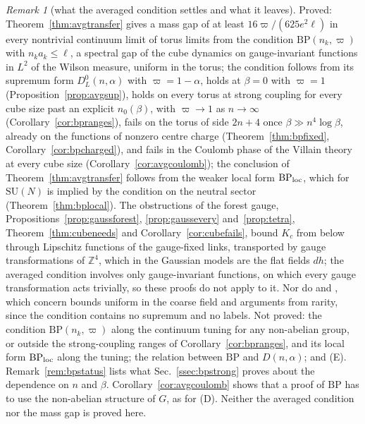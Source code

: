 \documentclass[aps,prd,twocolumn,superscriptaddress,nofootinbib,longbibliography,floatfix,amsmath,amssymb,10pt]{revtex4-2}
\theoremstyle{definition}
\theoremstyle{remark}
\newtheorem{remark}[theorem]{Remark}
\newcommand{\Z}{\mathbb{Z}}
\newcommand{\SU}{\mathrm{SU}}
\begin{document}
\begin{remark}[what the averaged condition settles and what it
leaves]\label{rem:avgstatus}
Proved: Theorem~\ref{thm:avgtransfer} gives a mass gap of at least
$16\varpi/(625e^2\ell)$ in every nontrivial continuum limit of torus limits
from the condition $\mathrm{BP}(n_k,\varpi)$ with $n_ka_k\le\ell$, a
spectral gap of the cube dynamics on gauge-invariant functions in
$L^2$ of the Wilson measure, uniform in the torus; the condition follows
from its supremum form $D^0_L(n,\alpha)$ with $\varpi=1-\alpha$, holds at
$\beta=0$ with $\varpi=1$ (Proposition~\ref{prop:avgsup}), holds on every
torus at strong coupling for every cube size past an explicit $n_0(\beta)$,
with $\varpi\to1$ as $n\to\infty$ (Corollary~\ref{cor:bpranges}), fails on
the torus of side $2n+4$ once $\beta\gg n^4\log\beta$, already on the
functions of nonzero centre charge (Theorem~\ref{thm:bpfixed},
Corollary~\ref{cor:bpcharged}), and fails in the Coulomb phase of the Villain
theory at every cube size (Corollary~\ref{cor:avgcoulomb}); the conclusion of
Theorem~\ref{thm:avgtransfer} follows from the weaker local form
$\mathrm{BP}_{\rm loc}$, which for $\SU(N)$ is implied by the condition on
the neutral sector (Theorem~\ref{thm:bplocal}). The obstructions of the forest gauge,
Propositions~\ref{prop:gaussforest}, \ref{prop:gaussevery}
and~\ref{prop:tetra}, Theorem~\ref{thm:cubeneeds} and
Corollary~\ref{cor:cubefails}, bound $K_c$ from below through Lipschitz
functions of the gauge-fixed links, transported by gauge transformations
of $\Z^4$, which in the Gaussian models are the flat fields $dh$; the
averaged condition
involves only gauge-invariant functions, on which every gauge
transformation acts trivially, so these proofs do not apply to it. Nor do
\cite[Theorem~505]{BBLR26} and \cite[Proposition~455]{BBLR26},
which concern bounds uniform in the coarse field and arguments from rarity,
since the condition contains no supremum and no labels. Not proved: the
condition $\mathrm{BP}(n_k,\varpi)$ along the continuum tuning for any
non-abelian group, or outside the strong-coupling ranges of
Corollary~\ref{cor:bpranges}, and its local form $\mathrm{BP}_{\rm loc}$
along the tuning; the relation between $\mathrm{BP}$ and
$D(n,\alpha)$; and (E). Remark~\ref{rem:bpstatus} lists what
Sec.~\ref{ssec:bpstrong} proves about the dependence on $n$ and $\beta$. Corollary~\ref{cor:avgcoulomb}
shows that a proof of $\mathrm{BP}$ has to use the non-abelian structure of
$G$, as for (D). Neither the averaged condition nor the mass gap is proved
here.
\end{remark}
\end{document}
